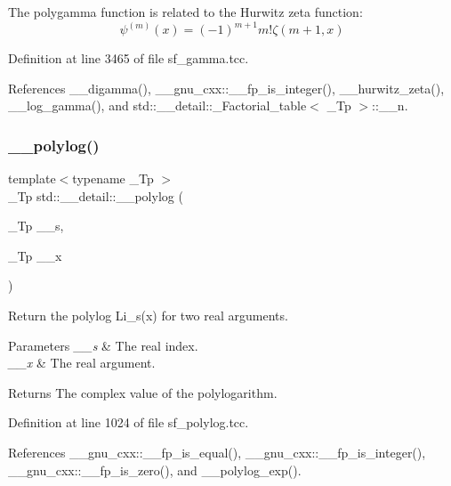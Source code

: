 The polygamma function is related to the Hurwitz zeta function\+: \[ \psi^{(m)}(x) = (-1)^{m+1} m! \zeta(m+1,x) \] 

Definition at line 3465 of file sf\+\_\+gamma.\+tcc.



References \+\_\+\+\_\+digamma(), \+\_\+\+\_\+gnu\+\_\+cxx\+::\+\_\+\+\_\+fp\+\_\+is\+\_\+integer(), \+\_\+\+\_\+hurwitz\+\_\+zeta(), \+\_\+\+\_\+log\+\_\+gamma(), and std\+::\+\_\+\+\_\+detail\+::\+\_\+\+Factorial\+\_\+table$<$ \+\_\+\+Tp $>$\+::\+\_\+\+\_\+n.

\mbox{\label{namespacestd_1_1____detail_a17fb8cea11706f319aaea277188a29c8}} 
\subsubsection{\texorpdfstring{\+\_\+\+\_\+polylog()}{\_\_polylog()}\hspace{0.1cm}{\footnotesize\ttfamily [1/2]}}
{\footnotesize\ttfamily template$<$typename \+\_\+\+Tp $>$ \\
\+\_\+\+Tp std\+::\+\_\+\+\_\+detail\+::\+\_\+\+\_\+polylog (\begin{DoxyParamCaption}\item[{\+\_\+\+Tp}]{\+\_\+\+\_\+s,  }\item[{\+\_\+\+Tp}]{\+\_\+\+\_\+x }\end{DoxyParamCaption})}

Return the polylog Li\+\_\+s(x) for two real arguments.


\begin{DoxyParams}{Parameters}
{\em \+\_\+\+\_\+s} & The real index. \\
\hline
{\em \+\_\+\+\_\+x} & The real argument. \\
\hline
\end{DoxyParams}
\begin{DoxyReturn}{Returns}
The complex value of the polylogarithm. 
\end{DoxyReturn}


Definition at line 1024 of file sf\+\_\+polylog.\+tcc.



References \+\_\+\+\_\+gnu\+\_\+cxx\+::\+\_\+\+\_\+fp\+\_\+is\+\_\+equal(), \+\_\+\+\_\+gnu\+\_\+cxx\+::\+\_\+\+\_\+fp\+\_\+is\+\_\+integer(), \+\_\+\+\_\+gnu\+\_\+cxx\+::\+\_\+\+\_\+fp\+\_\+is\+\_\+zero(), and \+\_\+\+\_\+polylog\+\_\+exp().



